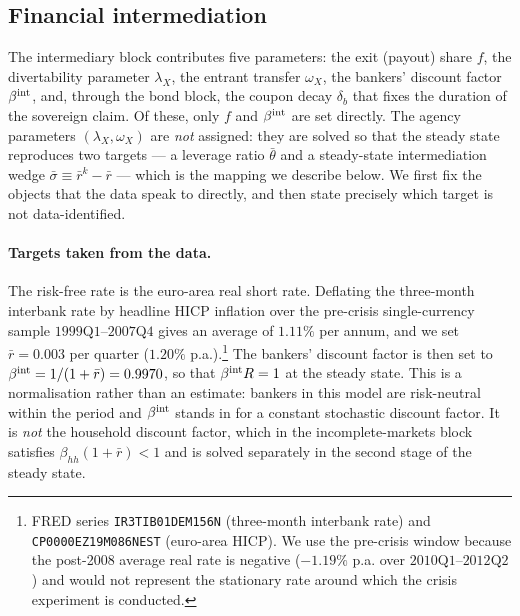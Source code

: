 
\subsection{Financial intermediation}
\label{sec:bankcal}

The intermediary block contributes five parameters: the exit (payout) share $f$,
the divertability parameter $\lambda_X$, the entrant transfer $\omega_X$, the
bankers' discount factor $\beta^{\rm int}$, and, through the bond block, the
coupon decay $\delta_b$ that fixes the duration of the sovereign claim. Of these,
only $f$ and $\beta^{\rm int}$ are set directly. The agency parameters
$(\lambda_X,\omega_X)$ are \emph{not} assigned: they are solved so that the
steady state reproduces two targets --- a leverage ratio $\bar\theta$ and a
steady-state intermediation wedge $\bar\sigma\equiv\bar r^{k}-\bar r$ --- which
is the mapping we describe below. We first fix the objects that the data speak
to directly, and then state precisely which target is not data-identified.

\paragraph{Targets taken from the data.}
The risk-free rate is the euro-area real short rate. Deflating the three-month
interbank rate by headline HICP inflation over the pre-crisis single-currency
sample $1999\text{Q}1$--$2007\text{Q}4$ gives an average of $1.11\%$ per annum,
and we set $\bar r=0.003$ per quarter ($1.20\%$ p.a.).\footnote{FRED series
\texttt{IR3TIB01DEM156N} (three-month interbank rate) and
\texttt{CP0000EZ19M086NEST} (euro-area HICP). We use the pre-crisis window
because the post-2008 average real rate is negative ($-1.19\%$ p.a. over
$2010\text{Q}1$--$2012\text{Q}2$) and would not represent the stationary rate
around which the crisis experiment is conducted.} The bankers' discount factor is
then set to $\beta^{\rm int}=1/(1+\bar r)=0.9970$, so that $\beta^{\rm int}R=1$
at the steady state. This is a normalisation rather than an estimate: bankers in
this model are risk-neutral within the period and $\beta^{\rm int}$ stands in for
a constant stochastic discount factor. It is \emph{not} the household discount
factor, which in the incomplete-markets block satisfies
$\beta_{hh}(1+\bar r)<1$ and is solved separately in the second stage of the
steady state.

